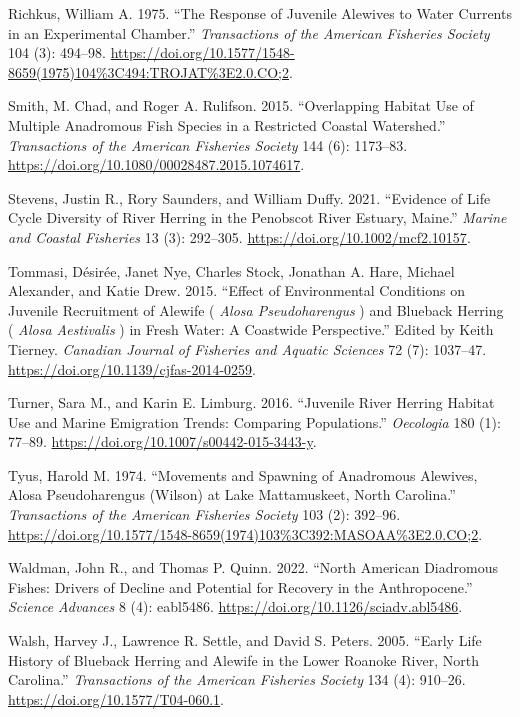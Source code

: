 \documentclass[
]{book}
\newlength{\cslhangindent}
\newlength{\cslentryspacingunit} %
\newenvironment{CSLReferences}[2] %
 {%
  \setlength{\parindent}{0pt}
  \ifodd #1
  \let\oldpar\par
  \def\par{\hangindent=\cslhangindent\oldpar}
  \fi
  \setlength{\parskip}{#2\cslentryspacingunit}
 }%
 {}
\begin{document}
\begin{CSLReferences}{1}{0}
\leavevmode{}%
Richkus, William A. 1975. {``The {Response} of {Juvenile} {Alewives} to {Water} {Currents} in an {Experimental} {Chamber}.''} \emph{Transactions of the American Fisheries Society} 104 (3): 494--98. \url{https://doi.org/10.1577/1548-8659(1975)104\%3C494:TROJAT\%3E2.0.CO;2}.

\leavevmode{}%
Smith, M. Chad, and Roger A. Rulifson. 2015. {``Overlapping {Habitat} {Use} of {Multiple} {Anadromous} {Fish} {Species} in a {Restricted} {Coastal} {Watershed}.''} \emph{Transactions of the American Fisheries Society} 144 (6): 1173--83. \url{https://doi.org/10.1080/00028487.2015.1074617}.

\leavevmode{}%
Stevens, Justin R., Rory Saunders, and William Duffy. 2021. {``Evidence of {Life} {Cycle} {Diversity} of {River} {Herring} in the {Penobscot} {River} {Estuary}, {Maine}.''} \emph{Marine and Coastal Fisheries} 13 (3): 292--305. \url{https://doi.org/10.1002/mcf2.10157}.

\leavevmode{}%
Tommasi, Désirée, Janet Nye, Charles Stock, Jonathan A. Hare, Michael Alexander, and Katie Drew. 2015. {``Effect of Environmental Conditions on Juvenile Recruitment of Alewife ( \emph{{Alosa} Pseudoharengus} ) and Blueback Herring ( \emph{{Alosa} Aestivalis} ) in Fresh Water: A Coastwide Perspective.''} Edited by Keith Tierney. \emph{Canadian Journal of Fisheries and Aquatic Sciences} 72 (7): 1037--47. \url{https://doi.org/10.1139/cjfas-2014-0259}.

\leavevmode{}%
Turner, Sara M., and Karin E. Limburg. 2016. {``Juvenile River Herring Habitat Use and Marine Emigration Trends: Comparing Populations.''} \emph{Oecologia} 180 (1): 77--89. \url{https://doi.org/10.1007/s00442-015-3443-y}.

\leavevmode{}%
Tyus, Harold M. 1974. {``Movements and {Spawning} of {Anadromous} {Alewives}, {Alosa} Pseudoharengus ({Wilson}) at {Lake} {Mattamuskeet}, {North} {Carolina}.''} \emph{Transactions of the American Fisheries Society} 103 (2): 392--96. \url{https://doi.org/10.1577/1548-8659(1974)103\%3C392:MASOAA\%3E2.0.CO;2}.

\leavevmode{}%
Waldman, John R., and Thomas P. Quinn. 2022. {``North {American} Diadromous Fishes: {Drivers} of Decline and Potential for Recovery in the {Anthropocene}.''} \emph{Science Advances} 8 (4): eabl5486. \url{https://doi.org/10.1126/sciadv.abl5486}.

\leavevmode{}%
Walsh, Harvey J., Lawrence R. Settle, and David S. Peters. 2005. {``Early {Life} {History} of {Blueback} {Herring} and {Alewife} in the {Lower} {Roanoke} {River}, {North} {Carolina}.''} \emph{Transactions of the American Fisheries Society} 134 (4): 910--26. \url{https://doi.org/10.1577/T04-060.1}.

\end{CSLReferences}
\end{document}
